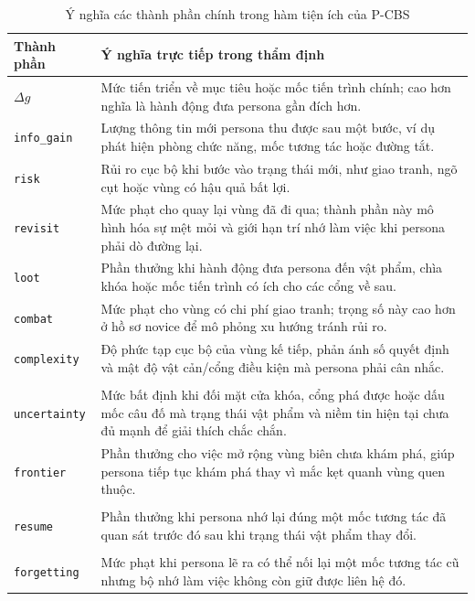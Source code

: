 \documentclass[oneside,a4paper,12pt]{extreport}
\begin{document}
\begin{table}[H]
\centering
\scriptsize
\setlength{\tabcolsep}{3pt}
\renewcommand{\arraystretch}{0.93}
\caption{Ý nghĩa các thành phần chính trong hàm tiện ích của P-CBS}
\label{tab:pcbs_term_meanings}
\begin{tabular}{>{\raggedright\arraybackslash}p{3.05cm} >{\raggedright\arraybackslash}p{8.75cm}}
\toprule
Thành phần & Ý nghĩa trực tiếp trong thẩm định \\
\midrule
$\Delta g$ & Mức tiến triển về mục tiêu hoặc mốc tiến trình chính; cao hơn nghĩa là hành động đưa persona gần đích hơn. \\
\texttt{info\_gain} & Lượng thông tin mới persona thu được sau một bước, ví dụ phát hiện phòng chức năng, mốc tương tác hoặc đường tắt. \\
\texttt{risk} & Rủi ro cục bộ khi bước vào trạng thái mới, như giao tranh, ngõ cụt hoặc vùng có hậu quả bất lợi. \\
\texttt{revisit} & Mức phạt cho quay lại vùng đã đi qua; thành phần này mô hình hóa sự mệt mỏi và giới hạn trí nhớ làm việc khi persona phải dò đường lại. \\
\texttt{loot} & Phần thưởng khi hành động đưa persona đến vật phẩm, chìa khóa hoặc mốc tiến trình có ích cho các cổng về sau. \\
\texttt{combat} & Mức phạt cho vùng có chi phí giao tranh; trọng số này cao hơn ở hồ sơ novice để mô phỏng xu hướng tránh rủi ro. \\
\texttt{complexity} & Độ phức tạp cục bộ của vùng kế tiếp, phản ánh số quyết định và mật độ vật cản/cổng điều kiện mà persona phải cân nhắc. \\
\shortstack[l]{\texttt{conditional\_}\\\texttt{uncertainty}} & Mức bất định khi đối mặt cửa khóa, cổng phá được hoặc dấu mốc câu đố mà trạng thái vật phẩm và niềm tin hiện tại chưa đủ mạnh để giải thích chắc chắn. \\
\texttt{frontier} & Phần thưởng cho việc mở rộng vùng biên chưa khám phá, giúp persona tiếp tục khám phá thay vì mắc kẹt quanh vùng quen thuộc. \\
\shortstack[l]{\texttt{affordance\_}\\\texttt{resume}} & Phần thưởng khi persona nhớ lại đúng một mốc tương tác đã quan sát trước đó sau khi trạng thái vật phẩm thay đổi. \\
\shortstack[l]{\texttt{affordance\_}\\\texttt{forgetting}} & Mức phạt khi persona lẽ ra có thể nối lại một mốc tương tác cũ nhưng bộ nhớ làm việc không còn giữ được liên hệ đó. \\

\end{tabular}
\end{table}
\end{document}
